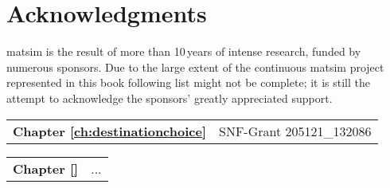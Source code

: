 \chapter*{Acknowledgments}
\gls{matsim} is the result of more than 10\,years of intense research, funded by numerous sponsors. Due to the large extent of the continuous \gls{matsim} project represented in this book following list might not be complete; it is still the attempt to acknowledge the sponsors' greatly appreciated support. 

\begin{tabular}[width=0.48\textwidth]{@{}l l}
\textbf{Chapter \ref{ch:destinationchoice}} & SNF-Grant 205121\_132086  \\
\end{tabular}


\begin{tabular}[width=0.48\textwidth]{@{}l l}
\textbf{Chapter \ref{}} & ... \\
\end{tabular}

